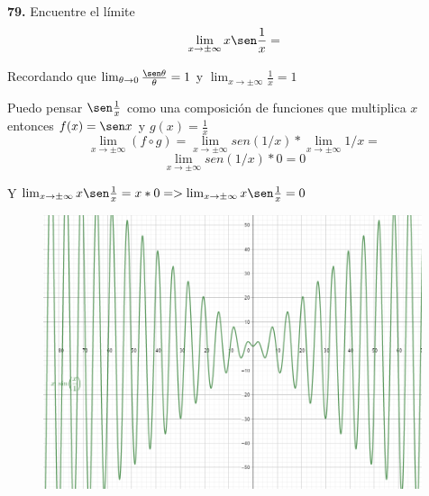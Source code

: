 \documentclass[12pt, letterpaper]{article}
\begin{document}
\newpage
\textbf{79.} Encuentre el límite \\

$$\lim_{x \to \pm \infty} x \sen \frac{1}{x}= $$ 

Recordando que $\lim_{\theta \to 0} \frac{\sen \theta}{\theta}= 1$ y $\lim_{x \to \pm \infty} \frac{1}{x}= 1$

Puedo pensar $\sen \frac{1}{x}$ como una composición de funciones que multiplica $x$ entonces $f(x) = \sen x$ y $g(x) = \frac{1}{x}$
$$\lim_{x \to \pm \infty} (f \circ g) = \lim_{x \to \pm \infty} sen (1/x) * \lim_{x \to \pm \infty} 1/x = $$ 
$$ \lim_{x \to \pm \infty} sen (1/x) * 0 = 0$$ 

Y $\lim_{x \to \pm \infty} x \sen \frac{1}{x}= x* 0 => \lim_{x \to \pm \infty} x \sen \frac{1}{x} = 0$
\begin{figure}[tbh]
\centering
\includegraphics[width=30em]{t11cinco}
\end{figure}
\end{document}
